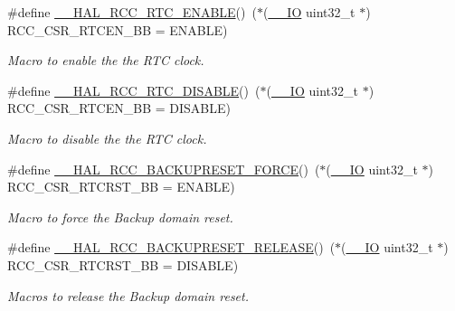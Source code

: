 \begin{DoxyCompactItemize}
\#define \hyperlink{group___r_c_c___r_t_c___clock___configuration_gab7cc36427c31da645a0e38e181f8ce0f}{\-\_\-\-\_\-\-H\-A\-L\-\_\-\-R\-C\-C\-\_\-\-R\-T\-C\-\_\-\-E\-N\-A\-B\-L\-E}()~($\ast$(\hyperlink{core__sc300_8h_aec43007d9998a0a0e01faede4133d6be}{\-\_\-\-\_\-\-I\-O} uint32\-\_\-t $\ast$) R\-C\-C\-\_\-\-C\-S\-R\-\_\-\-R\-T\-C\-E\-N\-\_\-\-B\-B = E\-N\-A\-B\-L\-E)
\begin{DoxyCompactList}\small\item\em Macro to enable the the R\-T\-C clock. \end{DoxyCompactList}\item 
\#define \hyperlink{group___r_c_c___r_t_c___clock___configuration_gaab5eeb81fc9f0c8d4450069f7a751855}{\-\_\-\-\_\-\-H\-A\-L\-\_\-\-R\-C\-C\-\_\-\-R\-T\-C\-\_\-\-D\-I\-S\-A\-B\-L\-E}()~($\ast$(\hyperlink{core__sc300_8h_aec43007d9998a0a0e01faede4133d6be}{\-\_\-\-\_\-\-I\-O} uint32\-\_\-t $\ast$) R\-C\-C\-\_\-\-C\-S\-R\-\_\-\-R\-T\-C\-E\-N\-\_\-\-B\-B = D\-I\-S\-A\-B\-L\-E)
\begin{DoxyCompactList}\small\item\em Macro to disable the the R\-T\-C clock. \end{DoxyCompactList}\item 
\#define \hyperlink{group___r_c_c___r_t_c___clock___configuration_ga3bf7da608ff985873ca8e248fb1dc4f0}{\-\_\-\-\_\-\-H\-A\-L\-\_\-\-R\-C\-C\-\_\-\-B\-A\-C\-K\-U\-P\-R\-E\-S\-E\-T\-\_\-\-F\-O\-R\-C\-E}()~($\ast$(\hyperlink{core__sc300_8h_aec43007d9998a0a0e01faede4133d6be}{\-\_\-\-\_\-\-I\-O} uint32\-\_\-t $\ast$) R\-C\-C\-\_\-\-C\-S\-R\-\_\-\-R\-T\-C\-R\-S\-T\-\_\-\-B\-B = E\-N\-A\-B\-L\-E)
\begin{DoxyCompactList}\small\item\em Macro to force the Backup domain reset. \end{DoxyCompactList}\item 
\hypertarget{group___r_c_c___r_t_c___clock___configuration_ga14f32622c65f4ae239ba8cb00d510321}{\#define \hyperlink{group___r_c_c___r_t_c___clock___configuration_ga14f32622c65f4ae239ba8cb00d510321}{\-\_\-\-\_\-\-H\-A\-L\-\_\-\-R\-C\-C\-\_\-\-B\-A\-C\-K\-U\-P\-R\-E\-S\-E\-T\-\_\-\-R\-E\-L\-E\-A\-S\-E}()~($\ast$(\hyperlink{core__sc300_8h_aec43007d9998a0a0e01faede4133d6be}{\-\_\-\-\_\-\-I\-O} uint32\-\_\-t $\ast$) R\-C\-C\-\_\-\-C\-S\-R\-\_\-\-R\-T\-C\-R\-S\-T\-\_\-\-B\-B = D\-I\-S\-A\-B\-L\-E)}\label{group___r_c_c___r_t_c___clock___configuration_ga14f32622c65f4ae239ba8cb00d510321}

\begin{DoxyCompactList}\small\item\em Macros to release the Backup domain reset. \end{DoxyCompactList}\end{DoxyCompactItemize}


